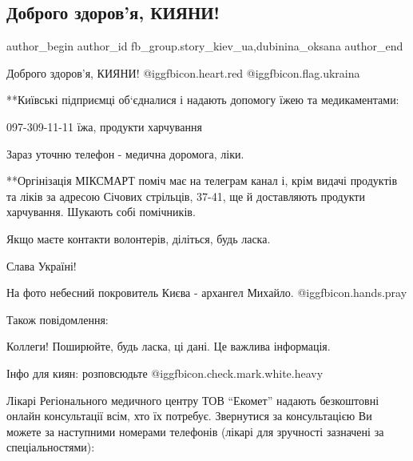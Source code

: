  
 
 
 
 
 
\subsection{Доброго здоров’я, КИЯНИ!}
\label{sec:02_03_2022.fb.fb_group.story_kiev_ua.2.dobrogo_zdorovja_kijany}
 
\ifcmt
 author_begin
   author_id fb_group.story_kiev_ua,dubinina_oksana
 author_end
\fi

Доброго здоров’я, КИЯНИ! @igg{fbicon.heart.red} @igg{fbicon.flag.ukraina}

**Київські підприємці об‘єдналися і надають допомогу їжею та медикаментами:

097-309-11-11 їжа, продукти харчування

Зараз уточню телефон - медична доромога, ліки.

**Оргінізація МІКСМАРТ поміч має на телеграм канал і, крім видачі продуктів та
ліків за адресою Січових стрільців, 37-41, ще й доставляють продукти
харчування. Шукають собі помічників.

Якщо маєте контакти волонтерів, діліться, будь ласка.


Слава Україні! 

На фото небесний покровитель Києва - архангел Михайло. @igg{fbicon.hands.pray} 

Також повідомлення:

Коллеги! Поширюйте, будь ласка, ці дані. Це важлива інформація.

Інфо для киян: розповсюдьте @igg{fbicon.check.mark.white.heavy} 

Лікарі Регіонального медичного центру ТОВ \enquote{Екомет} надають безкоштовні онлайн
консультації всім, хто їх потребує. Звернутися за консультацією Ви можете за
наступними номерами телефонів (лікарі для зручності зазначені за
спеціальностями):

